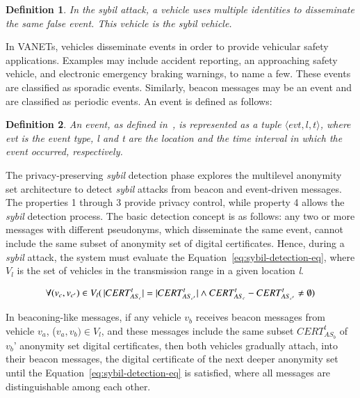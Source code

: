 \documentclass[preprint,12pt]{elsarticle}
\newtheorem{definition}{Definition}
\begin{document}

\begin{definition}
\label{def:sybil-event}
In the sybil attack, a vehicle uses multiple identities to disseminate the same false event. This vehicle is the sybil vehicle.
\end{definition}

In VANETs, vehicles disseminate events in order to provide vehicular safety applications. Examples may include accident reporting, an approaching safety vehicle, and electronic emergency braking warnings, to name a few. These events are classified as sporadic events. Similarly, beacon messages may be an event and are classified as periodic events. An event is defined as follows:

\begin{definition}
\label{def:event}
An event, as defined in~\cite{p2dap2}, is represented as a tuple $\langle evt, l, t \rangle$, where \textit{evt} is the event type, \textit{l} and \textit{t} are the location and the time interval in which the event occurred, respectively.
\end{definition}

The privacy-preserving \textit{sybil} detection phase explores the multilevel anonymity set architecture to detect \textit{sybil} attacks from beacon and event-driven messages. The properties 1 through 3 provide privacy control, while property 4 allows the \textit{sybil} detection process. The basic detection concept is as follows: any two or more messages with different pseudonyms, which disseminate the same event, cannot include the same subset of anonymity set of digital certificates. Hence, during a \textit{sybil} attack, the system must evaluate the Equation~\ref{eq:sybil-detection-eq}, where $V_{l}$ is the set of vehicles in the transmission range in a given location \textit{l}.

\begin{equation}
\label{eq:sybil-detection-eq}
\forall (v_{c}, v_{c'}) \in V_{l} (\thinspace |CERT^{t}_{AS_{c}}| = |CERT^{t}_{AS_{c'}}| \wedge CERT^{t}_{AS_{c}} - CERT^{t}_{AS_{c'}} \neq \emptyset)
\end{equation}

In beaconing-like messages, if any vehicle $v_{b}$ receives beacon messages from vehicle $v_{a}$, ($v_{a}, v_{b}) \in V_{l}$, and these messages include the same subset $CERT^{t}_{AS_{b}}$ of $v_{b}$' anonymity set digital certificates, then both vehicles gradually attach, into their beacon messages, the digital certificate of the next deeper anonymity set until the Equation~\ref{eq:sybil-detection-eq} is satisfied, where all messages are distinguishable among each other.
\end{document}
